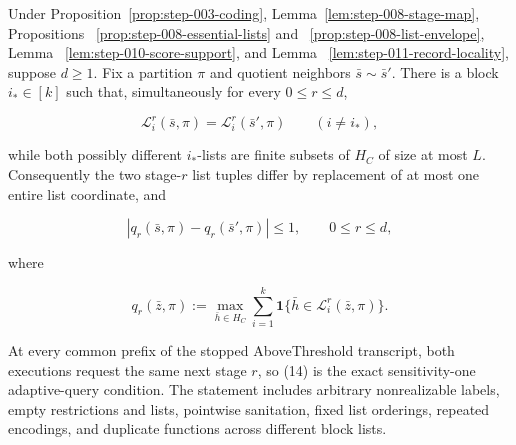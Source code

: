 \begin{proposition}\label{prop:step-011-list-locality}
Under Proposition~\ref{prop:step-003-coding}, Lemma~\ref{lem:step-008-stage-map},  Propositions
~\ref{prop:step-008-essential-lists} and
~\ref{prop:step-008-list-envelope}, Lemma
~\ref{lem:step-010-score-support}, and Lemma
~\ref{lem:step-011-record-locality}, suppose \(d\geq1\). Fix a partition
\(\pi\) and quotient neighbors \(\bar s\sim\bar s'\). There is a block
\(i_*\in[k]\) such that, simultaneously for every \(0\leq r\leq d\),

\[
 \mathcal L_i^r(\bar s,\pi)
 =\mathcal L_i^r(\bar s',\pi)
 \qquad(i\ne i_*),
\tag{13}
\]

while both possibly different \(i_*\)-lists are finite subsets of \(H_C\)
of size at most \(L\). Consequently the two stage-\(r\) list tuples differ
by replacement of at most one entire list coordinate, and

\[
 |q_r(\bar s,\pi)-q_r(\bar s',\pi)|\leq1,
 \qquad 0\leq r\leq d,
\tag{14}
\]

where

\[
 q_r(\bar z,\pi)
 :=\max_{\bar h\in H_C}
   \sum_{i=1}^k
   \mathbf1\{\bar h\in\mathcal L_i^r(\bar z,\pi)\}.
\tag{15}
\]

At every common prefix of the stopped AboveThreshold transcript, both
executions request the same next stage \(r\), so (14) is the exact
sensitivity-one adaptive-query condition. The statement includes arbitrary
nonrealizable labels, empty restrictions and lists, pointwise sanitation,
fixed list orderings, repeated encodings, and duplicate functions across
different block lists.


\end{proposition}


